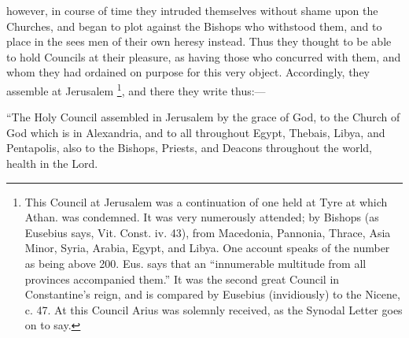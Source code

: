 however, in course of time they intruded themselves without shame upon
the Churches, and began to plot against the Bishops who withstood
them, and to place in the sees men of their own heresy instead. Thus
they thought to be able to hold Councils at their pleasure, as having
those who concurred with them, and whom they had ordained on purpose
for this very object. Accordingly, they assemble at Jerusalem \footnote{This Council at Jerusalem was a continuation of one held at Tyre at
which Athan. was condemned. It was very numerously attended; by
Bishops (as Eusebius says, Vit. Const. iv. 43), from Macedonia,
Pannonia, Thrace, Asia Minor, Syria, Arabia, Egypt, and Libya. One
account speaks of the number as being above 200. Eus. says that an ``innumerable
multitude from all provinces accompanied them.'' It was the second
great Council in Constantine's reign, and is compared by Eusebius
(invidiously) to the Nicene, c. 47. At this Council Arius was solemnly
received, as the Synodal Letter goes on to say.}, and there they write thus:—

``The Holy Council assembled in
Jerusalem by the grace of God, to the Church of God which is in
Alexandria, and to all throughout Egypt, Thebais, Libya, and
Pentapolis, also to the Bishops, Priests, and Deacons throughout the
world, health in the Lord.

